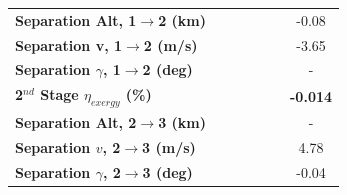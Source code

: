 \begin{table}[!ht]
\begin{tabular}{l c c c c c c}
	\textbf{Separation Alt, 1$\rightarrow$2 (km)}
	& \firstsecondSeparationAltmFuelNinetyNoReturn
	& \firstsecondSeparationAltmFuelNinetyFiveNoReturn
	& \firstsecondSeparationAltmFuelStandardNoReturn
	& \firstsecondSeparationAltmFuelOneHundredFiveNoReturn
	& \firstsecondSeparationAltmFuelOneHundredTenNoReturn
	&-0.08
	\\
	\textbf{Separation v, 1$\rightarrow$2 (m/s)}
	& \firstsecondSeparationvmFuelNinetyNoReturn
	& \firstsecondSeparationvmFuelNinetyFiveNoReturn
	& \firstsecondSeparationvmFuelStandardNoReturn
	& \firstsecondSeparationvmFuelOneHundredFiveNoReturn
	& \firstsecondSeparationvmFuelOneHundredTenNoReturn
	&-3.65
	\\
	\textbf{Separation $\gamma$, 1$\rightarrow$2 (deg)}
	& \firstsecondSeparationgammamFuelNinetyNoReturn
	& \firstsecondSeparationgammamFuelNinetyFiveNoReturn
	& \firstsecondSeparationgammamFuelStandardNoReturn
	& \firstsecondSeparationgammamFuelOneHundredFiveNoReturn
	& \firstsecondSeparationgammamFuelOneHundredTenNoReturn
	& -
	\\
	\hline 
	\textbf{2$^{nd}$ Stage $\eta_{exergy}$ (\%)}
	& \textbf{\secondExergyEffmFuelNinetyNoReturn}
	& \textbf{\secondExergyEffmFuelNinetyFiveNoReturn}
	& \textbf{\secondExergyEffmFuelStandardNoReturn}
	& \textbf{\secondExergyEffmFuelOneHundredFiveNoReturn}
	& \textbf{\secondExergyEffmFuelOneHundredTenNoReturn}
	& \textbf{-0.014}
	\\

	\textbf{Separation Alt, 2$\rightarrow$3 (km)}
	& \secondthirdSeparationAltmFuelNinetyNoReturn
	& \secondthirdSeparationAltmFuelNinetyFiveNoReturn
	& \secondthirdSeparationAltmFuelStandardNoReturn
	& \secondthirdSeparationAltmFuelOneHundredFiveNoReturn
	& \secondthirdSeparationAltmFuelOneHundredTenNoReturn
	& -
	\\
	\textbf{Separation $v$, 2$\rightarrow$3 (m/s)}
	& \secondthirdSeparationvmFuelNinetyNoReturn
	& \secondthirdSeparationvmFuelNinetyFiveNoReturn
	& \secondthirdSeparationvmFuelStandardNoReturn
	& \secondthirdSeparationvmFuelOneHundredFiveNoReturn
	& \secondthirdSeparationvmFuelOneHundredTenNoReturn
	&4.78
	\\
	\textbf{Separation $\gamma$, 2$\rightarrow$3 (deg)}
	& \secondthirdSeparationgammamFuelNinetyNoReturn
	& \secondthirdSeparationgammamFuelNinetyFiveNoReturn
	& \secondthirdSeparationgammamFuelStandardNoReturn
	& \secondthirdSeparationgammamFuelOneHundredFiveNoReturn
	& \secondthirdSeparationgammamFuelOneHundredTenNoReturn
	&-0.04
	\\


\end{tabular}
\end{table}
